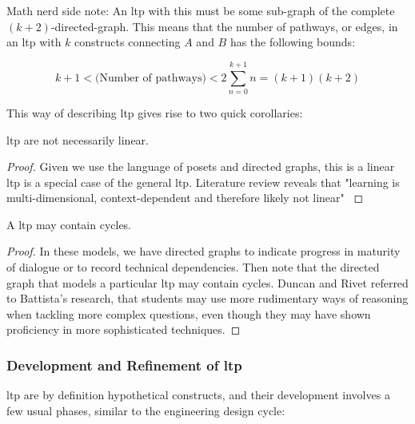 \documentclass{TC}
\begin{document}
\begin{remark}
Math nerd side note: An \gls{ltp} with this must be some sub-graph of the complete $(k+2)$-directed-graph. This means that the number of pathways, or edges, in an \gls{ltp} with $k$ constructs connecting $A$ and $B$ has the following bounds:

$$ k+ 1 < \text{(Number of pathways)} < 2\sum_{n=0}^{k+1}n = (k+1)(k+2)$$ 

\end{remark}

This way of describing \gls{ltp} gives rise to two quick corollaries:

\begin{corollary}
 \gls{ltp} are not necessarily linear.
\begin{proof}Given we use the language of posets and directed graphs, this is a linear \gls{ltp} is a special case of the general \gls{ltp}. Literature review reveals that "learning is multi-dimensional, context-dependent and therefore likely not linear" \parencite{duncan_learning_2018}\end{proof}
\end{corollary}

\begin{corollary}
A \gls{ltp} may contain cycles.

\begin{proof}In these models, we have directed graphs to indicate progress in maturity of dialogue or to record technical dependencies. Then note that the directed graph that models a particular \gls{ltp} may contain cycles. Duncan and Rivet \parencite{duncan_learning_2018} referred to Battista's research, that students may use more rudimentary ways of reasoning when tackling more complex questions, even though they may have shown proficiency in more sophisticated techniques.
 \end{proof}
\end{corollary}
\subsubsection{Development and Refinement of \gls{ltp}}
\gls{ltp} are by definition hypothetical constructs, and their development involves a few usual phases, similar to the engineering design cycle:
\end{document}
